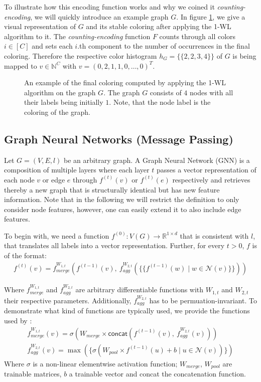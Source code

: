 \documentclass[11pt, dvipsnames, DIV=12]{scrreprt}
\theoremstyle{definition}
\newcommand{\MSopen}{\{\!\!\{}
\newcommand{\MSclose}{\}\!\!\}}
\begin{document}
To illustrate how this encoding function works and why we coined it \emph{counting-encoding}, we will quickly introduce an example graph $G$. In figure \ref{Encoding example}, we give a visual representation of $G$ and its stable coloring after applying the 1-WL algorithm to it. The \emph{counting-encoding} function $F$ counts through all colors $i \in [C]$ and sets each $i$.th component to the number of occurrences in the final coloring. Therefore the respective color histogram $h_G = \MSopen 2, 2, 3, 4 \MSclose$ of $G$ is being mapped to $v \in \mathbb{N}^C$ with $v = (0, 2, 1, 1,0,  \dots ,0)^T$.
\begin{figure}[H]
    \centering
    
    \caption{An example of the final coloring computed by applying the 1-WL algorithm on the graph $G$. The graph $G$ consists of $4$ nodes with all their labels being initially $1$. Note, that the node label is the coloring of the graph.}
    \label{Encoding example}
\end{figure}

\subsection{Graph Neural Networks (Message Passing)}\label{sec:GNN Defintion}
Let $G = (V, E, l)$ be an arbitrary graph. A Graph Neural Network (GNN) is a composition of multiple layers where each layer $t$ passes a vector representation of each node $v$ or edge $e$ through $f^{(t)}(v)$ or $f^{(t)}(e)$ respectively and retrieves thereby a new graph that is structurally identical but has new feature information. Note that in the following we will restrict the definition to only consider node features, however, one can easily extend it to also include edge features. 

To begin with, we need a function $f^{(0)}: V(G) \rightarrow \mathbb{R}^{1 \times d}$ that is consistent with $l$, that translates all labels into a vector representation. Further, for every $t > 0$, $f$ is of the format:
\begin{align}
f^{(t)}(v) = f^{W_{1,t}}_{merge} (f^{(t-1)}(v), \  f^{W_{2,t}}_{agg}( \MSopen f^{(t-1)}(w) \mid w \in \mathcal{N}(v) \MSclose ))
\end{align}

\noindent Where $f^{W_{1,t}}_{merge}$ and $f^{W_{2,t}}_{agg}$ are arbitrary differentiable functions with $W_{1,t}$ and $W_{2,t}$ their respective parameters. Additionally, $f^{W_{2,t}}_{agg}$ has to be permuation-invariant. To demonstrate what kind of functions are typically used, we provide the functions used by \cite{Ham+2017}:
\begin{align}
    f^{W_{1,t}}_{merge}(v) = \sigma (W_{merge} \times \textsf{concat}(f^{(t-1)}(v), \ f^{W_{2,t}}_{agg}(v)))\\
    f^{W_{2,t}}_{agg}(v) = \max(\{ \sigma(W_{pool} \times f^{(t-1)}(u) + b \mid u \in \mathcal{N}(v))\})
\end{align}
\noindent Where $\sigma$ is a non-linear elementwise activation function; $W_{merge}$, $W_{pool}$ are trainable matrices, $b$ a trainable vector and \textsf{concat} the concatenation function.
\end{document}
